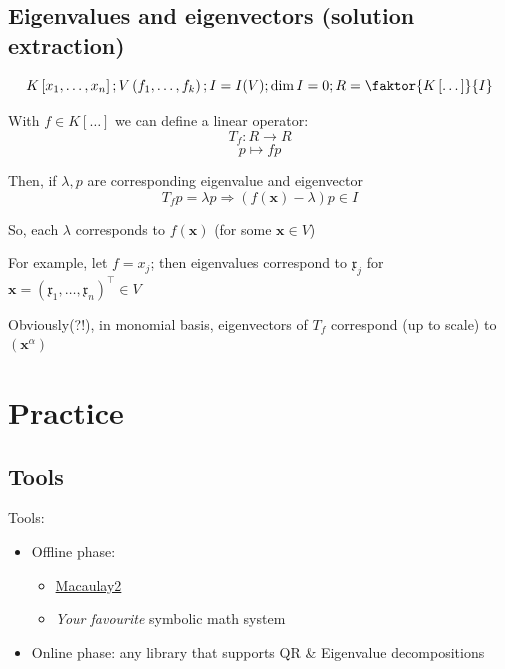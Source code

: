 \subsection{Eigenvalues and eigenvectors (solution extraction)}
\begin{frame}
    $$K\left[x_1,\dots,x_n\right]; V\left(f_1,\dots,f_k\right); I=I(V); \dim I = 0; R=\faktor{K\left[\dots\right]}{I}$$

    With $f \in K\left[\dots\right]$ we can define a linear operator:
    $$T_f:R\rightarrow R$$
    $$p\mapsto f p$$

    Then, if $\lambda,p$ are corresponding eigenvalue and eigenvector
    $$T_f p = \lambda p \Rightarrow \left(f\left(\mathbf{x}\right)-\lambda\right)p\in I$$

    So, each $\lambda$ corresponds to $f\left(\mathbf{x}\right)$ (for some $\mathbf{x}\in V$)

    For example, let $f=x_j$; then eigenvalues correspond to $\mathfrak{x}_j$ for $\mathbf{x}=\left(\mathfrak{x}_1,\dots,\mathfrak{x}_n\right)^\top\in V$

    Obviously(?!), in monomial basis, eigenvectors of $T_f$ correspond (up to scale) to $\left(\mathbf{x}^\alpha\right)$
\end{frame}



\section{Practice}
\subsection{Tools}
\begin{frame}
    Tools:
    \begin{itemize}
        \item Offline phase:
            \begin{itemize}
                \item \href{http://www2.macaulay2.com/Macaulay2/}{Macaulay2}
                \item \textit{Your favourite} symbolic math system
            \end{itemize}
        \item Online phase: any library that supports QR \& Eigenvalue decompositions
    \end{itemize}
\end{frame}

